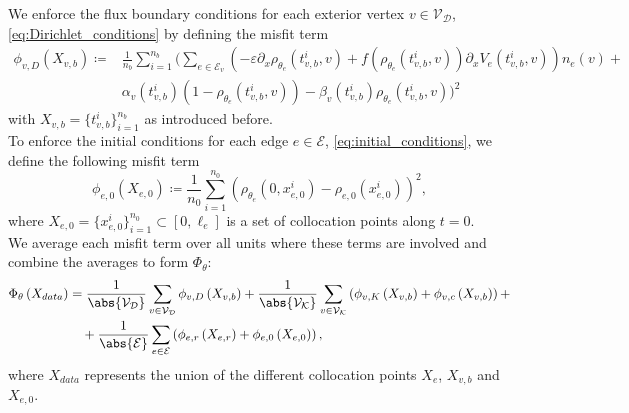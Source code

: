 We enforce the flux boundary conditions for each exterior vertex $v \in \mathcal{V}_\mathcal{D}$, \cref{eq:Dirichlet_conditions} by defining the misfit term  
\begin{align} 
    \label{misfit:Dirichlet}
    \phi_{v,D}  \left( X_{v,b} \right) \coloneqq & \frac{1}{n_b} \sum_{i=1}^{n_b} \bigg( \sum_{e \in \mathcal{E}_v} \left(- \varepsilon \partial_x \rho_{\theta_e}  \left( t_{v,b}^i, v \right) + f\left(\rho_{\theta_e}  \left( t_{v,b}^i, v \right)\right) \partial_x V_e\left( t_{v,b}^i, v \right) \right) n_e  \left( v \right) + \\
    & \alpha_v \left( t_{v,b}^i \right)  \left( 1- \rho_{\theta_e}  \left( t_{v,b}^i, v \right) \right) - \beta_v \left( t_{v,b}^i \right) \rho_{\theta_e}  \left( t_{v,b}^i, v \right) \bigg)^2
\end{align}
with $X_{v,b} = \{t_{v,b}^i\}_{i=1}^{n_b}$ as introduced before. \\
To enforce the initial conditions for each edge $e \in \mathcal{E}$, \cref{eq:initial_conditions}, we define the following misfit term  
\begin{equation} 
    \label{misfit:initial}
    \phi_{e,0}  \left( X_{e,0} \right) \coloneqq \frac{1}{n_0} \sum_{i=1}^{n_0}  \left( \rho_{\theta_e}  \left( 0,x_{e,0}^i \right) - \rho_{e,0} \left( x_{e,0}^i \right) \right)^2, 
\end{equation} 
where $X_{e,0} = \{x_{e,0}^i\}_{i=1}^{n_0} \subset [0, \ell_e]$ is a set of collocation points along $t=0$. \\ 

We average each misfit term over all units where these terms are involved and combine the averages to form $\Phi_\theta$:
\begin{align*} 
    \label{eq:loss}
    \Phi_{\theta} \left( X_{data} \right) & =  \frac{1}{\abs{\mathcal{V}_\mathcal{D}}} \sum_{v \in \mathcal{V}_\mathcal{D}} \phi_{v,D} \left( X_{v,b} \right) + \frac{1}{\abs{\mathcal{V}_\mathcal{K}}} \sum_{v \in \mathcal{V}_\mathcal{K}}  \left(  \phi_{v,K}  \left( X_{v,b} \right) + \phi_{v,c} \left( X_{v,b} \right)  \right) + \\
    & \quad + \frac{1}{\abs{\mathcal{E}}} \sum_{e \in \mathcal{E}}  \left(  \phi_{e,r}  \left( X_{e,r} \right) + \phi_{e,0}  \left( X_{e,0} \right)  \right), 
\end{align*}
where $X_{data}$ represents the union of the different collocation points $X_e$, $X_{v,b}$ and $X_{e,0}$. 


